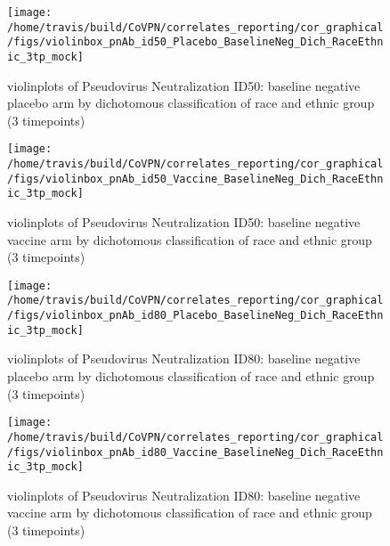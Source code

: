 \documentclass[]{book}
\theoremstyle{definition}
\theoremstyle{definition}
\theoremstyle{definition}
\newcommand{\1}{\mathbbm{1}}
\begin{document}
\clearpage
\begin{figure}[H]

{\centering \texttt{[image: /home/travis/build/CoVPN/correlates\_reporting/cor\_graphical/figs/violinbox\_pnAb\_id50\_Placebo\_BaselineNeg\_Dich\_RaceEthnic\_3tp\_mock]} 

}

\caption{violinplots of Pseudovirus Neutralization ID50: baseline negative placebo arm by dichotomous classification of race and ethnic group (3 timepoints)}\label{fig:unnamed-chunk-247}
\end{figure}

\clearpage
\begin{figure}[H]

{\centering \texttt{[image: /home/travis/build/CoVPN/correlates\_reporting/cor\_graphical/figs/violinbox\_pnAb\_id50\_Vaccine\_BaselineNeg\_Dich\_RaceEthnic\_3tp\_mock]} 

}

\caption{violinplots of Pseudovirus Neutralization ID50: baseline negative vaccine arm by dichotomous classification of race and ethnic group (3 timepoints)}\label{fig:unnamed-chunk-248}
\end{figure}

\clearpage
\begin{figure}[H]

{\centering \texttt{[image: /home/travis/build/CoVPN/correlates\_reporting/cor\_graphical/figs/violinbox\_pnAb\_id80\_Placebo\_BaselineNeg\_Dich\_RaceEthnic\_3tp\_mock]} 

}

\caption{violinplots of Pseudovirus Neutralization ID80: baseline negative placebo arm by dichotomous classification of race and ethnic group (3 timepoints)}\label{fig:unnamed-chunk-249}
\end{figure}

\clearpage
\begin{figure}[H]

{\centering \texttt{[image: /home/travis/build/CoVPN/correlates\_reporting/cor\_graphical/figs/violinbox\_pnAb\_id80\_Vaccine\_BaselineNeg\_Dich\_RaceEthnic\_3tp\_mock]} 

}

\caption{violinplots of Pseudovirus Neutralization ID80: baseline negative vaccine arm by dichotomous classification of race and ethnic group (3 timepoints)}\label{fig:unnamed-chunk-250}
\end{figure}
\end{document}
